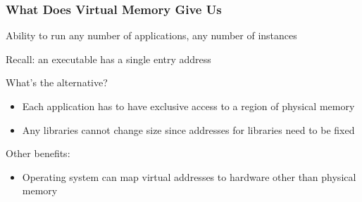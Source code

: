 \documentclass[aspectratio=169]{beamer}
\begin{document}
  \begin{frame}
    \frametitle{What Does Virtual Memory Give Us}

    Ability to run any number of applications, any number of instances

    \hspace{1em} Recall: an executable has a single entry address

    \vspace{2em}

    What's the alternative?

    \begin{itemize}
      \item Each application has to have exclusive access to a region of
            physical memory
      \item Any libraries cannot change size since addresses for libraries need
            to be fixed
    \end{itemize}

    \vspace{2em}

    Other benefits:
    \begin{itemize}
      \item Operating system can map virtual addresses to hardware other than
            physical memory
    \end{itemize}
  \end{frame}
\end{document}
